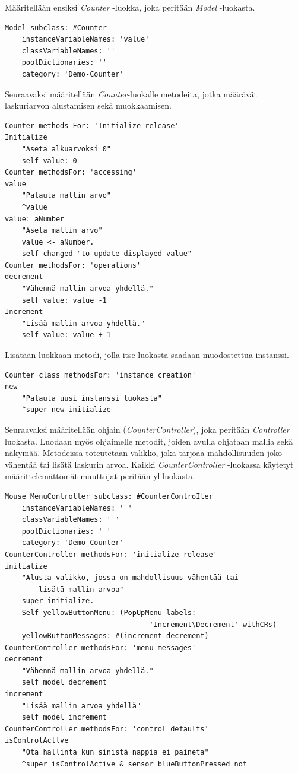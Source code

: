\documentclass[utf8]{gradu3}
\begin{document}
Määritellään ensiksi \emph{Counter} -luokka, joka peritään \emph{Model} -luokasta.
\begin{lstlisting}[language=Smalltalk]
Model subclass: #Counter
	instanceVariableNames: 'value'
	classVariableNames: ''
	poolDictionaries: ''
  	category: 'Demo-Counter'
\end{lstlisting}
Seuraavaksi määritellään \emph{Counter}-luokalle metodeita, jotka määrävät
laskuriarvon alustamisen sekä muokkaamisen.
\begin{lstlisting}[language=Smalltalk]
Counter methods For: 'Initialize-release'
Initialize
	"Aseta alkuarvoksi 0"
	self value: 0
Counter methodsFor: 'accessing'
value
	"Palauta mallin arvo"
   	^value
value: aNumber
	"Aseta mallin arvo"
	value <- aNumber.
	self changed "to update displayed value"
Counter methodsFor: 'operations'
decrement
	"Vähennä mallin arvoa yhdellä."
	self value: value -1
Increment
	"Lisää mallin arvoa yhdellä."
	self value: value + 1
\end{lstlisting}
Lisätään luokkaan metodi, jolla itse luokasta saadaan muodostettua instanssi.
\begin{lstlisting}[language=Smalltalk]
Counter class methodsFor: 'instance creation'
new
	"Palauta uusi instanssi luokasta"
	^super new initialize
\end{lstlisting}
Seuraavaksi määritellään ohjain (\emph{CounterController}), joka peritään
\emph{Controller} luokasta. Luodaan myös ohjaimelle metodit, joiden avulla
ohjataan mallia sekä näkymää. Metodeissa toteutetaan valikko, joka tarjoaa
mahdollisuuden joko vähentää tai lisätä laskurin arvoa. Kaikki \emph{CounterController} -luokassa käytetyt
määrittelemättömät muuttujat peritään yliluokasta.
\begin{lstlisting}[language=Smalltalk]
Mouse MenuController subclass: #CounterControIler
	instanceVariableNames: ' '
  	classVariableNames: ' '
  	poolDictionaries: ' '
  	category: 'Demo-Counter'
CounterController methodsFor: 'initialize-release'
initialize
	"Alusta valikko, jossa on mahdollisuus vähentää tai 
        lisätä mallin arvoa"
  	super initialize.
  	Self yellowButtonMenu: (PopUpMenu labels: 
                                  'Increment\Decrement' withCRs)
  	yellowButtonMessages: #(increment decrement)
CounterController methodsFor: 'menu messages'
decrement
	"Vähennä mallin arvoa yhdellä."
 	self model decrement
increment
	"Lisää mallin arvoa yhdellä"
	self model increment
CounterController methodsFor: 'control defaults'
isControlActlve
	"Ota hallinta kun sinistä nappia ei paineta"
	^super isControlActive & sensor blueButtonPressed not
\end{lstlisting}
\end{document}
